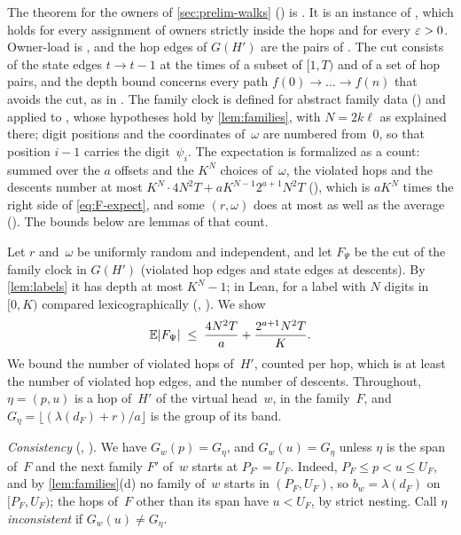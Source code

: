 \begin{outline}
The theorem for the owners of \cref{sec:prelim-walks} () is . It is an instance of
, which holds for every assignment of owners strictly inside the hops and for every $\varepsilon>0$. Owner-load is
, and the hop edges of $G(H')$ are the pairs of . The cut consists of the state edges
$t\to t-1$ at the times of a subset of $[1,T)$ and of a set of hop pairs, and the depth bound concerns every path
$f(0)\to\dots\to f(n)$ that avoids the cut, as in . The family clock is defined for abstract family data
() and applied to , whose hypotheses  hold by \cref{lem:families}, with
$N=2k\ell$ as explained there; digit positions and the coordinates of~$\omega$ are numbered from~$0$, so that position $i-1$
carries the digit~$\psi_i$. The expectation is formalized as a count: summed over the $a$ offsets and the $K^N$ choices
of~$\omega$, the violated hops and the descents number at most $K^N\cdot4N^2T+aK^{N-1}2^{a+1}N^2T$
(), which is $aK^N$ times the right side of \eqref{eq:F-expect}, and some $(r,\omega)$ does at most
as well as the average (). The bounds below are lemmas of that count.

Let $r$ and~$\omega$ be uniformly random and independent, and let $F_\Psi$ be the cut of the family clock in $G(H')$
(violated hop edges and state edges at descents). By \cref{lem:labels} it has depth at most $K^N-1$; in Lean, for a label
with $N$ digits in $[0,K)$ compared lexicographically (, ). We show
\begin{equation}\label{eq:F-expect}
  \mathbb E\lvert F_\Psi \rvert\;\le\;\frac{4N^2T}a+\frac{2^{a+1}N^2T}K.
\end{equation}
We bound the number of violated hops of~$H'$, counted per hop, which is at least the number of violated hop edges, and the
number of descents. Throughout, $\eta=(p,u)$ is a hop of~$H'$ of the virtual head~$w$, in the family~$F$, and
$G_\eta=\lfloor(\lambda(d_F)+r)/a\rfloor$ is the group of its band.

\emph{Consistency} (, ). We have $G_w(p)=G_\eta$, and $G_w(u)=G_\eta$
unless $\eta$ is the span of~$F$ and the next family $F'$ of~$w$ starts at $P_{F'}=U_F$. Indeed, $P_F\le p<u\le U_F$, and
by \cref{lem:families}(d) no family of~$w$ starts in $(P_F,U_F)$, so $b_w=\lambda(d_F)$ on $[P_F,U_F)$; the hops of~$F$
other than its span have $u<U_F$, by strict nesting. Call $\eta$ \emph{inconsistent} if $G_w(u)\ne G_\eta$.


\end{outline}
